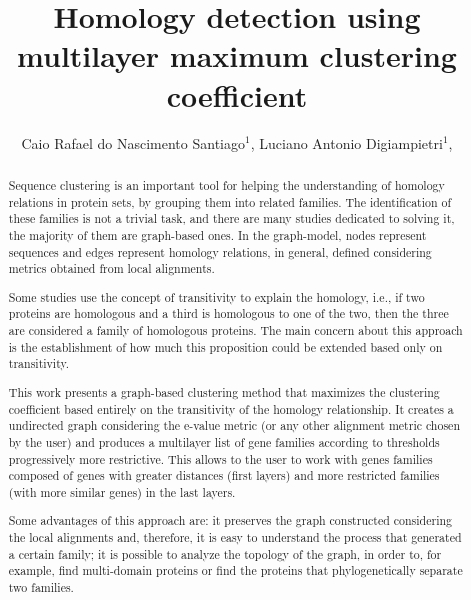 \documentclass[twoside]{article}
\title{\vspace{-15mm}\fontsize{24pt}{10pt}\selectfont\textbf{ Homology detection using multilayer maximum clustering coefficient }} %
\author{ Caio Rafael do Nascimento Santiago$^{1}$, Luciano Antonio Digiampietri$^{1}$, }
\affil{ 1 Universidade de São Paulo

 }
\date{}
\begin{document}
  
  
  \maketitle %
  
  
  \thispagestyle{fancy} %
  
  
  \begin{abstract}
  Sequence clustering is an important tool for helping the understanding of homology relations in protein sets, by grouping them into related families. The identification of these families is not a trivial task, and there are many studies dedicated to solving it, the majority of them are graph-based ones. In the graph-model, nodes represent sequences and edges represent homology relations, in general, defined considering metrics obtained from local alignments.

Some studies use the concept of transitivity to explain the homology, i.e., if two proteins are homologous and a third is homologous to one of the two, then the three are considered a family of homologous proteins. The main concern about this approach is the establishment of how much this proposition could be extended based only on transitivity.

This work presents a graph-based clustering method that maximizes the clustering coefficient based entirely on the transitivity of the homology relationship. It creates a undirected graph considering the e-value metric (or any other alignment metric chosen by the user) and produces a multilayer list of gene families according to thresholds progressively more restrictive. This allows to the user to work with genes families composed of genes with greater distances (first layers) and more restricted families (with more similar genes) in the last layers.

Some advantages of this approach are: it preserves the graph constructed considering the local alignments and, therefore, it is easy to understand the process that generated a certain family; it is possible to analyze the topology of the graph, in order to, for example, find multi-domain proteins or find the proteins that phylogenetically separate two families. 


\end{abstract}
\end{document}
